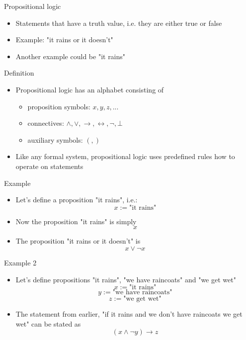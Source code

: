 \documentclass[utf8]{beamer}
\let\iff\leftrightarrow
\let\implies\rightarrow
\begin{document}
\begin{frame}{Propositional logic}
\begin{itemize}
\item Statements that have a truth value, i.e. they are either true or false
\item Example: "it rains or it doesn't"
\item Another example could be "it rains"
\end{itemize}
\end{frame}

\begin{frame}{Definition}
\begin{itemize}
\item Propositional logic has an alphabet consisting of
\begin{itemize}
\item proposition symbols: $x, y, z, ...$
\item connectives: $\land, \lor, \implies, \iff, \neg, \bot$
\item auxiliary symbols: $(, )$
\end{itemize}
\item Like any formal system, propositional logic uses predefined rules how to operate on statements
\end{itemize}
\end{frame}

\begin{frame}{Example}
\begin{itemize}
\item Let's define a proposition "it rains", i.e.:
\[ x := \text{"it rains"} \]
\item Now the proposition "it rains" is simply
\[ x \]
\item The proposition "it rains or it doesn't" is
\[ x \lor \neg x \]
\end{itemize}
\end{frame}

\begin{frame}{Example 2}
\begin{itemize}
\item Let's define propositions "it rains", "we have raincoats" and "we get wet"
\[ x := \text{"it rains"} \]
\[ y := \text{"we have raincoats"} \]
\[ z := \text{"we get wet"} \]
\item The statement from earlier, "if it rains and we don't have raincoats we get wet" can be stated as
\[ (x \land \neg y) \implies z \]
\end{itemize}
\end{frame}
\end{document}
